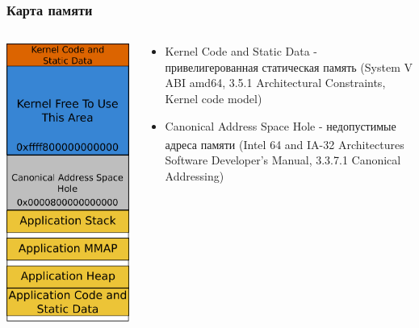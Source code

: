 \begin{frame}
\frametitle{Карта памяти}

\begin{columns}[T]

  \begin{column}{.4\textwidth}
    \includegraphics[width=.8\linewidth]{memmap}
  \end{column}

  \begin{column}{.6\textwidth}
    \begin{itemize}
      \item Kernel Code and Static Data - привелигерованная статическая память (System V ABI amd64, 3.5.1 Architectural Constraints, Kernel code model)
      \item Canonical Address Space Hole - недопустимые адреса памяти (Intel\textsuperscript{\textregistered} 64 and IA-32 Architectures Software Developer's Manual, 3.3.7.1 Canonical Addressing)
    \end{itemize}
  \end{column}
\end{columns}


\end{frame}
